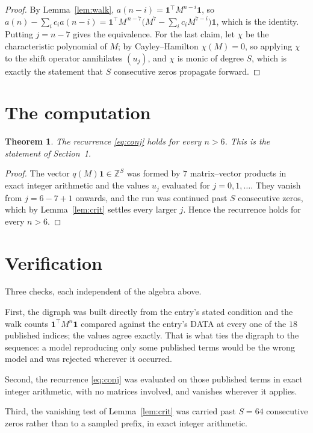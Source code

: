 \documentclass[11pt,a4paper]{article}
\theoremstyle{plain}
\newtheorem{theorem}{Theorem}
\theoremstyle{definition}
\begin{document}
\begin{proof}
By Lemma~\ref{lem:walk}, $a(n-i)=\mathbf{1}^{\!\top}M^{n-i}\mathbf{1}$, so
$a(n)-\sum_i c_i a(n-i)
=\mathbf{1}^{\!\top}M^{\,n-7}\bigl(M^{7}-\sum_i c_i M^{7-i}\bigr)
\mathbf{1}$, which is the identity. Putting $j=n-7$ gives the equivalence. For the
last claim, let $\chi$ be the characteristic polynomial of $M$; by Cayley--Hamilton
$\chi(M)=0$, so applying $\chi$ to the shift operator annihilates $(u_j)$, and $\chi$ is
monic of degree $S$, which is exactly the statement that $S$ consecutive zeros propagate
forward.
\end{proof}

\section{The computation}

\begin{theorem}
The recurrence \eqref{eq:conj} holds for every $n>6$. This is the statement of
Section~1.
\end{theorem}

\begin{proof}
The vector $q(M)\mathbf{1}\in\mathbb{Z}^{S}$ was formed by $7$ matrix--vector
products in exact integer arithmetic and the values $u_j$ evaluated for
$j=0,1,\dots$. They vanish from $j=6-7+1$ onwards, and the run was continued past
$S$ consecutive zeros, which by Lemma~\ref{lem:crit} settles every larger $j$. Hence the
recurrence holds for every $n>6$.
\end{proof}

\section{Verification}

Three checks, each independent of the algebra above.

First, the digraph was built directly from the entry's stated condition and the walk counts
$\mathbf{1}^{\!\top}M^{n}\mathbf{1}$ compared against the entry's DATA at every one of
the $18$ published indices; the values agree exactly. That is what ties the digraph to
the sequence: a model reproducing only some published terms would be the wrong model and
was rejected wherever it occurred.

Second, the recurrence \eqref{eq:conj} was evaluated on those published terms in exact
integer arithmetic, with no matrices involved, and vanishes wherever it applies.

Third, the vanishing test of Lemma~\ref{lem:crit} was carried past $S=64$ consecutive
zeros rather than to a sampled prefix, in exact integer arithmetic.
\end{document}
